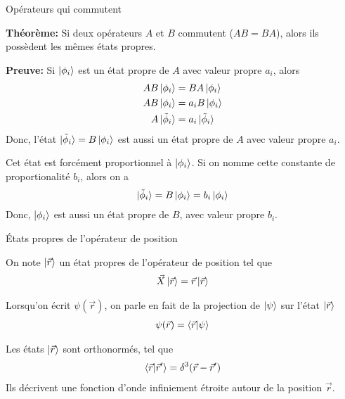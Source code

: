\documentclass[xcolor=svgnames,t,aspectratio=169,handout]{uqtrcours}
\begin{document}
\begin{frame}{Opérateurs qui commutent}

\textbf{Théorème:}
Si deux opérateurs $A$ et $B$ commutent ($AB=BA$), alors ils possèdent les mêmes états propres.

\medskip
\textbf{Preuve:} Si $\ket{\phi_i}$ est un état propre de $A$ avec valeur propre $a_i$, alors
\begin{align*}
  AB \ket{\phi_i} &= BA \ket{\phi_i}
  \\
  AB \ket{\phi_i} &=  a_i B \ket{\phi_i}
  \\
  A \ket{\tilde \phi_i} &=  a_i \ket{ \tilde \phi_i}
\end{align*}
Donc, l'état $\ket{\tilde \phi_i} = B \ket{\phi_i}$
  est aussi un état propre de $A$ avec valeur propre $a_i$.

\medskip
Cet état est forcément proportionnel à $\ket{\phi_i}$.
Si on nomme cette constante de proportionalité $b_i$,
  alors on a
\begin{align}
  \ket{\tilde \phi_i} = B \ket{\phi_i} = b_i \ket{\phi_i}
\end{align}
Donc, $\ket{\phi_i}$ est aussi un état propre de $B$,
  avec valeur propre $b_i$.


\end{frame}





\begin{frame}{États propres de l'opérateur de position}

On note $\ket{\vec r}$ un état propres de l'opérateur de position
  tel que
\begin{align}
  \vec X \ket{\vec r} = \vec r \ket{\vec r}
\end{align}

Lorsqu'on écrit $\psi(\vec r)$, on parle en fait de la projection
  de $\ket{\psi}$ sur l'état $\ket{\vec r}$
\begin{align}
  \psi(\vec r) = \braket{\vec r \vert \psi}
\end{align}

Les états $\ket{\vec r}$ sont orthonormés, tel que
\begin{align}
  \braket{\vec r \vert \vec r'} = \delta^3(\vec r - \vec r')
\end{align}
Ils décrivent une fonction d'onde infiniement étroite
  autour de la position $\vec r$.

\end{frame}
\end{document}
